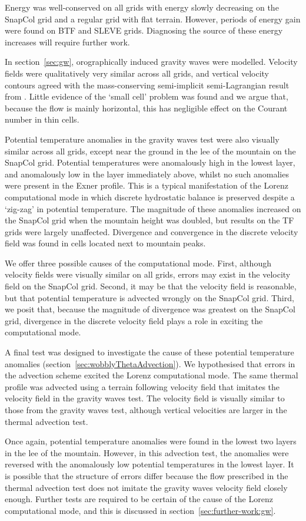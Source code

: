 Energy was well-conserved on all grids with energy slowly decreasing on the SnapCol grid and a regular grid with flat terrain.  However, periods of energy gain were found on BTF and SLEVE grids.  Diagnosing the source of these energy increases will require further work.

In section~\ref{sec:gw}, orographically induced gravity waves were modelled.  Velocity fields were qualitatively very similar across all grids, and vertical velocity contours agreed with the mass-conserving semi-implicit semi-Lagrangian result from \textcite{melvin2010}.  Little evidence of the `small cell' problem was found and we argue that, because the flow is mainly horizontal, this has negligible effect on the Courant number in thin cells.

Potential temperature anomalies in the gravity waves test were also visually similar across all grids, except near the ground in the lee of the mountain on the SnapCol grid.  Potential temperatures were anomalously high in the lowest layer, and anomalously low in the layer immediately above, whilst no such anomalies were present in the Exner profile.
This is a typical manifestation of the Lorenz computational mode in which discrete hydrostatic balance is preserved despite a `zig-zag' in potential temperature.
The magnitude of these anomalies increased on the SnapCol grid when the mountain height was doubled, but results on the TF grids were largely unaffected.  Divergence and convergence in the discrete velocity field was found in cells located next to mountain peaks.  

We offer three possible causes of the computational mode.  First, although velocity fields were visually similar on all grids, errors may exist in the velocity field on the SnapCol grid.  Second, it may be that the velocity field is reasonable, but that potential temperature is advected wrongly on the SnapCol grid.  Third, we posit that, because the magnitude of divergence was greatest on the SnapCol grid, divergence in the discrete velocity field plays a role in exciting the computational mode.

A final test was designed to investigate the cause of these potential temperature anomalies (section~\ref{sec:wobblyThetaAdvection}).  We hypothesised that errors in the advection scheme excited the Lorenz computational mode.  The same thermal profile was advected using a terrain following velocity field that imitates the velocity field in the gravity waves test.  The velocity field is visually similar to those from the gravity waves test, although vertical velocities are larger in the thermal advection test.

Once again, potential temperature anomalies were found in the lowest two layers in the lee of the mountain.  However, in this advection test, the anomalies were reversed with the anomalously low potential temperatures in the lowest layer.  It is possible that the structure of errors differ because the flow prescribed in the thermal advection test does not imitate the gravity waves velocity field closely enough.  Further tests are required to be certain of the cause of the Lorenz computational mode, and this is discussed in section~\ref{sec:further-work:gw}.
